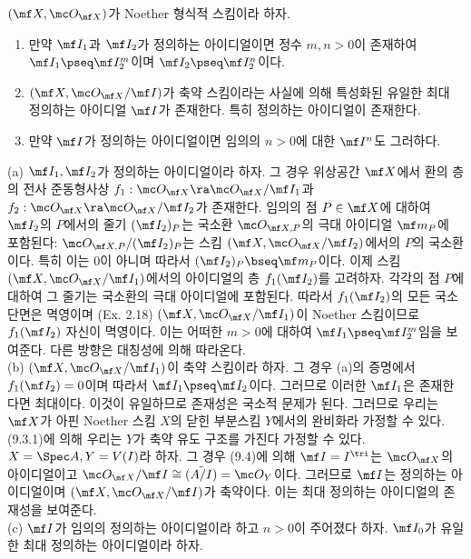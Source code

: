 	
	\begin{proposition}
	$(\mf X,\mc O_{\mf X})$가 Noether 형식적 스킴이라 하자.
	\begin{enumerate}[label=(\alph*)]
	\item 만약 $\mf I_1$과 $\mf I_2$가 정의하는 아이디얼이면
	정수 $m,n>0$이 존재하여 $\mf I_1\pseq\mf I_2^m$이며 $\mf I_2\pseq\mf I_2^n$이다.
	\item $(\mf X,\mc O_{\mf X}/\mf I)$가 축약 스킴이라는 사실에 의해 특성화된 유일한 최대 정의하는 아이디얼 $\mf I$가 존재한다.
	특히 정의하는 아이디얼이 존재한다.
	\item 만약 $\mf I$가 정의하는 아이디얼이면 임의의 $n>0$에 대한 $\mf I^n$도 그러하다.\\
	\end{enumerate}
	\pf (a) $\mf I_1,\mf I_2$가 정의하는 아이디얼이라 하자. 그 경우 위상공간 $\mf X$에서 환의 층의 전사 준동형사상
	$f_1:\mc O_{\mf X}\ra\mc O_{\mf X}/\mf I_1$과 $f_2:\mc O_{\mf X}\ra\mc O_{\mf X}/\mf I_2$가 존재한다.
	임의의 점 $P\in\mf X$에 대하여 $\mf I_2$의 $P$에서의 줄기 $(\mf I_2)_P$는 국소환 $\mc O_{\mf X,P}$의 극대 아이디얼 $\mf m_P$에 포함된다:
	$\mc O_{\mf X,P}/(\mf I_2)_P$는 스킴 $(\mf X,\mc O_{\mf X}/\mf I_2)$에서의 $P$의 국소환이다.
	특히 이는 0이 아니며 따라서 $(\mf I_2)_P\bseq\mf m_P$이다.
	이제 스킴 $(\mf X,\mc O_{\mf X}/\mf I_1)$에서의 아이디얼의 층 $f_1(\mf I_2)$를 고려하자.
	각각의 점 $P$에 대하여 그 줄기는 국소환의 극대 아이디얼에 포함된다. 따라서 $f_1(\mf I_2)$의 모든 국소 단면은 멱영이며 (Ex. 2.18)
	$(\mf X,\mc O_{\mf X}/\mf I_1)$이 Noether 스킴이므로 $f_1(\mf I_2)$ 자신이 멱영이다.
	이는 어떠한 $m>0$에 대하여 $\mf I_1\pseq\mf I_2^m$임을 보여준다. 다른 방향은 대칭성에 의해 따라온다.\\
	(b) $(\mf X,\mc O_{\mf X}/\mf I_1)$이 축약 스킴이라 하자.
	그 경우 (a)의 증명에서 $f_1(\mf I_2)=0$이며 따라서 $\mf I_1\pseq\mf I_2$이다.
	그러므로 이러한 $\mf I_1$은 존재한다면 최대이다. 이것이 유일하므로 존재성은 국소적 문제가 된다.
	그러므로 우리는 $\mf X$가 아핀 Noether 스킴 $X$의 닫힌 부분스킴 $Y$에서의 완비화라 가정할 수 있다.
	(9.3.1)에 의해 우리는 $Y$가 축약 유도 구조를 가진다 가정할 수 있다. $X=\Spec A,Y=V(I)$라 하자.
	그 경우 (9.4)에 의해 $\mf I=I^\tri$는 $\mc O_{\mf X}$의 아이디얼이고 $\mc O_{\mf X}/\mf I\cong\tilde{(A/I)}=\mc O_Y$이다.
	그러므로 $\mf I$는 정의하는 아이디얼이며 $(\mf X,\mc O_{\mf X}/\mf I)$가 축약이다. 이는 최대 정의하는 아이디얼의 존재성을 보여준다.\\
	(c) $\mf I$가 임의의 정의하는 아이디얼이라 하고 $n>0$이 주어졌다 하자. $\mf I_0$가 유일한 최대 정의하는 아이디얼이라 하자.

\end{proposition}
